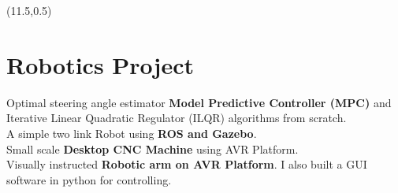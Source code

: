 \documentclass[article]{twentysecondcv_v2} %
\begin{document}
\begin{textblock}{9}(11.5,0.5)
\section{Robotics Project}
\begin{multiline}
\faBookmark[regular] Optimal steering angle estimator \textbf{Model Predictive Controller (MPC)} and Iterative Linear Quadratic Regulator (ILQR) algorithms from scratch. \\
\faBookmark[regular] A simple two link Robot using \textbf{ROS and Gazebo}. \\
\faBookmark[regular] Small scale \textbf{Desktop CNC Machine} using  AVR Platform. \\
\faBookmark[regular] Visually instructed \textbf{Robotic arm on AVR Platform}.  I also built a GUI software in python for controlling. 
\end{multiline}
\end{textblock}
\end{document}
